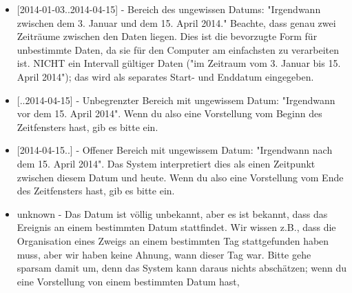 \documentclass[
  letterpaper,
  DIV=11,
  numbers=noendperiod,
  landscape,
  a4paper,
  geometry:margin=1in]{scrartcl}
\providecommand{\tightlist}{%
  \setlength{\itemsep}{0pt}\setlength{\parskip}{0pt}}\usepackage{longtable,booktabs,array}
\begin{document}
\begin{longtable}[]
\begin{minipage}[t]{\linewidth}
\begin{itemize}
  \begin{itemize}
  \tightlist
  \item
    Beispiel 1 \textquotesingle201X\textquotesingle{}
  \item
    Beispiel 2 \textquotesingle20XX\textquotesingle{}\\
    Jahr angegeben, Monat unspezifiziert in einem Jahr-Monat-Ausdruck
    (Monatsgenauigkeit)
  \item
    Beispiel 3 -XX\textquotesingle{}\\
    Jahr und Monat werden angegeben, der Tag wird in einem
    Jahr-Monat-Tag-Ausdruck nicht angegeben (Tagesgenauigkeit)
  \item
    Beispiel 4 -04-XX\textquotesingle{}\\
    Jahr angegeben, Tag und Monat nicht angegeben in einem
    Jahr-Monat-Tag-Ausdruck (Tagesgenauigkeit)
  \item
    Beispiel 5 -XX-XX\textquotesingle{}
  \end{itemize}
\item
  {[}2014-01-03..2014-04-15{]} - Bereich des ungewissen Datums:
  "Irgendwann zwischen dem 3. Januar und dem 15. April 2014." Beachte,
  dass genau zwei Zeiträume zwischen den Daten liegen. Dies ist die
  bevorzugte Form für unbestimmte Daten, da sie für den Computer am
  einfachsten zu verarbeiten ist. NICHT ein Intervall gültiger Daten
  ("im Zeitraum vom 3. Januar bis 15. April 2014"); das wird als
  separates Start- und Enddatum eingegeben.
\item
  {[}..2014-04-15{]} - Unbegrenzter Bereich mit ungewissem Datum:
  "Irgendwann vor dem 15. April 2014". Wenn du also eine Vorstellung vom
  Beginn des Zeitfensters hast, gib es bitte ein.
\item
  {[}2014-04-15..{]} - Offener Bereich mit ungewissem Datum: "Irgendwann
  nach dem 15. April 2014". Das System interpretiert dies als einen
  Zeitpunkt zwischen diesem Datum und heute. Wenn du also eine
  Vorstellung vom Ende des Zeitfensters hast, gib es bitte ein.
\item
  unknown - Das Datum ist völlig unbekannt, aber es ist bekannt, dass
  das Ereignis an einem bestimmten Datum stattfindet. Wir wissen z.B.,
  dass die Organisation eines Zweigs an einem bestimmten Tag
  stattgefunden haben muss, aber wir haben keine Ahnung, wann dieser Tag
  war. Bitte gehe sparsam damit um, denn das System kann daraus nichts
  abschätzen; wenn du eine Vorstellung von einem bestimmten Datum hast,

\end{itemize}
\end{minipage}
\end{longtable}
\end{document}
